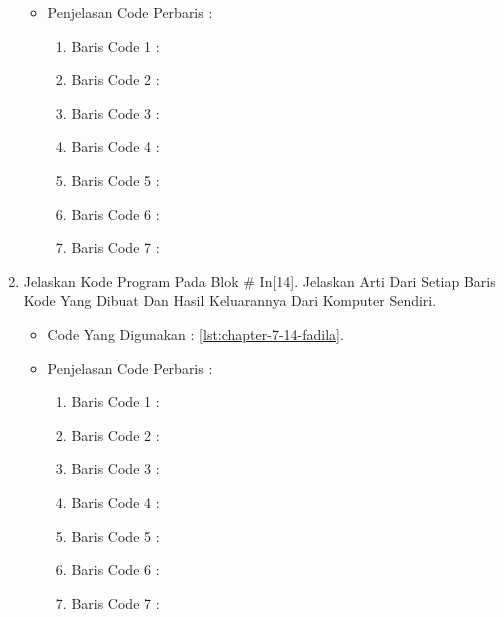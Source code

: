 \begin{enumerate}
\begin{itemize}

\par
\par
\item Penjelasan Code Perbaris	: 
\begin{enumerate}
\item Baris Code 1	:
\item Baris Code 2	:
\item Baris Code 3	:
\item Baris Code 4	:
\item Baris Code 5	:
\item Baris Code 6	:
\item Baris Code 7	:
\end{enumerate}
\par
\par
\par
\end{itemize}
\par
\par
\par
\item Jelaskan Kode Program Pada Blok \# In[14]. Jelaskan Arti Dari Setiap Baris Kode Yang Dibuat Dan Hasil Keluarannya Dari Komputer Sendiri.
\begin{itemize}
\item Code Yang Digunakan : \ref{lst:chapter-7-14-fadila}.

\par
\par
\item Penjelasan Code Perbaris	: 
\begin{enumerate}
\item Baris Code 1	:
\item Baris Code 2	:
\item Baris Code 3	:
\item Baris Code 4	:
\item Baris Code 5	:
\item Baris Code 6	:
\item Baris Code 7	:
\end{enumerate}
\par
\par
\end{itemize}
\par
\par

\end{enumerate}
